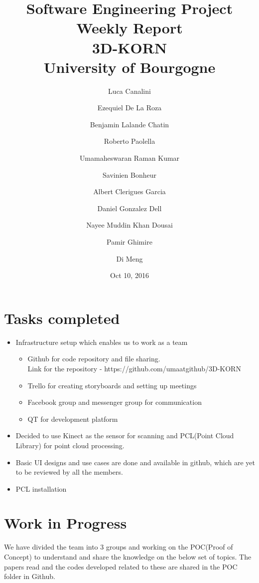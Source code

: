 \documentclass[11pt]{article} %
\title{Software Engineering Project Weekly Report\\ \textbf{3D-KORN} \\ University of Bourgogne}
\author{Luca Canalini \and Ezequiel De La Roza \and Benjamin Lalande Chatin \and Roberto Paolella \and Umamaheswaran Raman Kumar \and Savinien Bonheur \and Albert Clerigues Garcia \and Daniel Gonzalez Dell \and Nayee Muddin Khan Dousai \and Pamir Ghimire \and Di Meng
}
\date{Oct 10, 2016} %
\begin{document}
\maketitle
\newpage
\tableofcontents
\newpage

\section{Tasks completed}
\begin{itemize}
\item Infrastructure setup which enables us to work as a team
	\begin{itemize}
		\item Github for code repository and file sharing. \\Link for the repository -					https://github.com/umaatgithub/3D-KORN
		\item Trello for creating storyboards and setting up meetings
		\item Facebook group and messenger group for communication
		\item QT for development platform	
	\end{itemize}

\item Decided to use Kinect as the sensor for scanning and PCL(Point Cloud Library) for point cloud processing.
\item Basic UI designs and use cases are done and available in github, which are yet to be reviewed by all the members.
\item PCL installation
\end{itemize}

\section{Work in Progress}
We have divided the team into 3 groups and working on the POC(Proof of Concept) to understand and share the knowledge on the below set of topics. The papers read and the codes developed related to these are shared in the POC folder in Github. 
\end{document}
